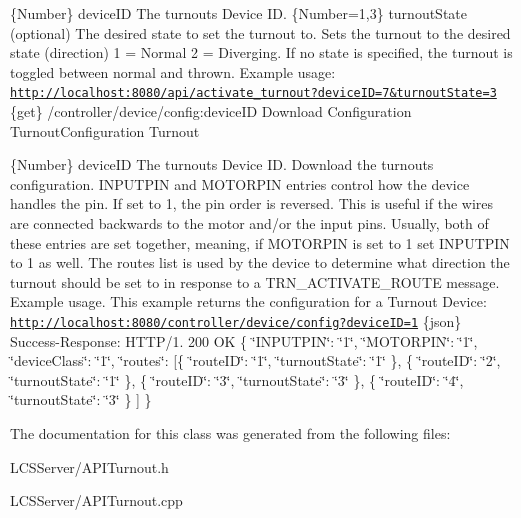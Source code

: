 \{Number\} device\+ID The turnout\textquotesingle{}s Device ID.  \{Number=1,3\} turnout\+State (optional) The desired state to set the turnout to.  Sets the turnout to the desired state (direction) 1 = Normal 2 = Diverging. If no state is specified, the turnout is toggled between normal and thrown.  Example usage\+: \href{http://localhost:8080/api/activate_turnout?deviceID=7&turnoutState=3}{\tt http\+://localhost\+:8080/api/activate\+\_\+turnout?device\+I\+D=7\&turnout\+State=3}  \{get\} /controller/device/config\+:device\+ID Download Configuration  Turnout\+Configuration  Turnout

\{Number\} device\+ID The turnout\textquotesingle{}s Device ID.  Download the turnout\textquotesingle{}s configuration. I\+N\+P\+U\+T\+P\+IN and M\+O\+T\+O\+R\+P\+IN entries control how the device handles the pin. If set to 1, the pin order is reversed. This is useful if the wires are connected backwards to the motor and/or the input pins. Usually, both of these entries are set together, meaning, if M\+O\+T\+O\+R\+P\+IN is set to 1 set I\+N\+P\+U\+T\+P\+IN to 1 as well. The routes list is used by the device to determine what direction the turnout should be set to in response to a T\+R\+N\+\_\+\+A\+C\+T\+I\+V\+A\+T\+E\+\_\+\+R\+O\+U\+TE message.  Example usage. This example returns the configuration for a Turnout Device\+: \href{http://localhost:8080/controller/device/config?deviceID=1}{\tt http\+://localhost\+:8080/controller/device/config?device\+I\+D=1}  \{json\} Success-\/\+Response\+: H\+T\+T\+P/1. 200 OK \{ \char`\"{}\+I\+N\+P\+U\+T\+P\+I\+N\char`\"{}\+: \char`\"{}1\char`\"{}, \char`\"{}\+M\+O\+T\+O\+R\+P\+I\+N\char`\"{}\+: \char`\"{}1\char`\"{}, \char`\"{}device\+Class\char`\"{}\+: \char`\"{}1\char`\"{}, \char`\"{}routes\char`\"{}\+: \mbox{[}\{ \char`\"{}route\+I\+D\char`\"{}\+: \char`\"{}1\char`\"{}, \char`\"{}turnout\+State\char`\"{}\+: \char`\"{}1\char`\"{} \}, \{ \char`\"{}route\+I\+D\char`\"{}\+: \char`\"{}2\char`\"{}, \char`\"{}turnout\+State\char`\"{}\+: \char`\"{}1\char`\"{} \}, \{ \char`\"{}route\+I\+D\char`\"{}\+: \char`\"{}3\char`\"{}, \char`\"{}turnout\+State\char`\"{}\+: \char`\"{}3\char`\"{} \}, \{ \char`\"{}route\+I\+D\char`\"{}\+: \char`\"{}4\char`\"{}, \char`\"{}turnout\+State\char`\"{}\+: \char`\"{}3\char`\"{} \} \mbox{]} \} 

The documentation for this class was generated from the following files\+:\begin{DoxyCompactItemize}
\item 
L\+C\+S\+Server/A\+P\+I\+Turnout.\+h\item 
L\+C\+S\+Server/A\+P\+I\+Turnout.\+cpp\end{DoxyCompactItemize}
